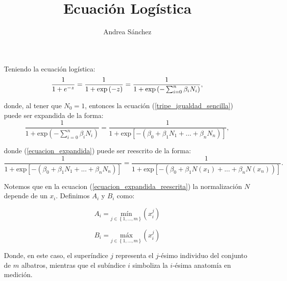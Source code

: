 \documentclass{article}
\begin{document}
\title{Ecuación Logística}
\author{Andrea Sánchez}
\maketitle
\begin{flushleft}

Teniendo la ecuación logística:
\begin{equation}
    \label{tripe_igualdad_sencilla}
    \frac{1}{1+e^{-z}} = \frac{1}{1+\mbox{\mbox{exp}}\left ( -z\right )} = \frac{1}{1+\mbox{\mbox{exp}}\left (-\sum_{i=0}^{n} \beta _{i}N_{i} \right )} ,
\end{equation}

donde, al tener que $N_{0}=1$, entonces la ecuación (\ref{tripe_igualdad_sencilla}) puede ser expandida de la forma:
\begin{equation}
    \label{ecuacion_expandida}
    \frac{1}{1+\mbox{exp}\left (-\sum_{i=0}^{n} \beta _{i}N_{i} \right )} = \frac{1}{1+\mbox{exp}\left [ -\left ( \beta _{0} + \beta _{1}N_{1}+...+\beta_{n}N_{n} \right ) \right ]} ,
\end{equation}

donde (\ref{ecuacion_expandida}) puede ser reescrito de la forma:
\begin{equation}
    \label{ecuacion_expandida_reescrita}    
    \frac{1}{1+\mbox{exp}\left [ -\left ( \beta _{0} + \beta _{1}N_{1}+...+\beta_{n}N_{n} \right ) \right ]} = \frac{1}{1+\mbox{exp}\left [ -\left ( \beta _{0} + \beta _{1}N(x_{1})+...+\beta_{n}N(x_{n})\right ) \right ]} .
\end{equation}

Notemos que en la ecuacion (\ref{ecuacion_expandida_reescrita}) la normalización $N$ depende de un $x_{i}$. Definimos $A_{i}$ y $B_{i}$ como:

\begin{equation}
    \label{maximos_A}
    A_{i}= \underset{j\in \left \{ 1,...,m \right \}}{\mbox{mín}}\left ( x_{i}^{j} \right )
\end{equation}

\begin{equation}
    \label{minimos_B}
    B_{i}= \underset{j\in \left \{ 1,...,m \right \}}{\mbox{máx}}\left ( x_{i}^{j} \right )
\end{equation}

Donde, en este caso, el superíndice $j$ representa el $j$-ésimo individuo del conjunto de $m$ albatros, mientras que el subíndice $i$ simboliza la $i$-ésima anatomía en medición.


\end{flushleft}
\end{document}
